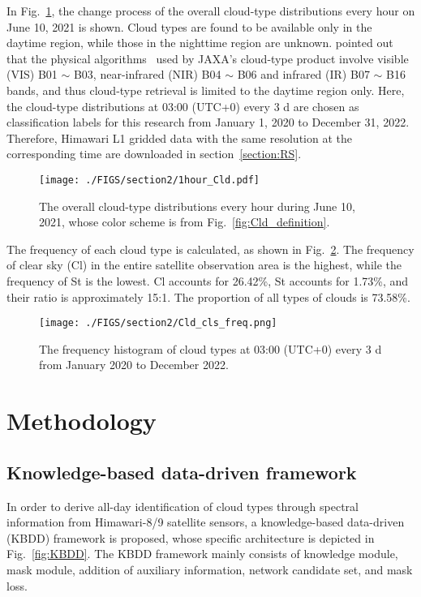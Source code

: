 \documentclass[review]{elsarticle}
\begin{document}
In Fig.~\ref{fig:1day_Cld}, the change process of the overall cloud-type distributions every hour on June 10, 2021 is shown.
Cloud types are found to be available only in the daytime region, while those in the nighttime region are unknown.
\citet{Wang2022113026} pointed out that the physical algorithms~\citep{Nakajima1995,Ishida2008JD010710} used by JAXA's cloud-type product involve visible (VIS) B01 $\sim$ B03, near-infrared (NIR) B04 $\sim$ B06 and infrared (IR) B07 $\sim$ B16 bands, and thus cloud-type retrieval is limited to the daytime region only.
Here, the cloud-type distributions at 03:00 (UTC+0) every 3 d are chosen as classification labels for this research from January 1, 2020 to December 31, 2022.
Therefore, Himawari L1 gridded data with the same resolution at the corresponding time are downloaded in section~\ref{section:RS}.

\begin{figure}[!htp]
    \centering
    \texttt{[image: ./FIGS/section2/1hour\_Cld.pdf]}
    \caption{The overall cloud-type distributions every hour during June 10, 2021, whose color scheme is from Fig.~\ref{fig:Cld_definition}.}
    \label{fig:1day_Cld}
\end{figure}

The frequency of each cloud type is calculated, as shown in Fig.~\ref{fig:Cld_cls_freq}.
The frequency of clear sky (Cl) in the entire satellite observation area is the highest, while the frequency of St is the lowest.
Cl accounts for 26.42\%, St accounts for 1.73\%, and their ratio is approximately 15:1.
The proportion of all types of clouds is 73.58\%.

\begin{figure}[!htp]
    \centering
    \texttt{[image: ./FIGS/section2/Cld\_cls\_freq.png]}
    \caption{The frequency histogram of cloud types at 03:00 (UTC+0) every 3 d from January 2020 to December 2022.}
    \label{fig:Cld_cls_freq}
\end{figure}


\section{Methodology}
\label{section:Methodology}
\subsection{Knowledge-based data-driven framework}
In order to derive all-day identification of cloud types through spectral information from Himawari-8/9 satellite sensors, a knowledge-based data-driven (KBDD) framework is proposed, whose specific architecture is depicted in Fig.~\ref{fig:KBDD}.
The KBDD framework mainly consists of knowledge module, mask module, addition of auxiliary information, network candidate set, and mask loss.
\end{document}
